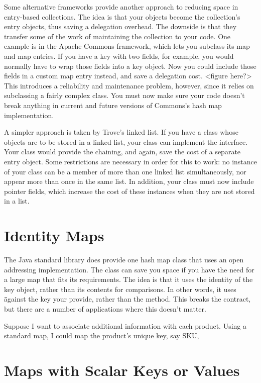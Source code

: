 Some alternative frameworks provide another approach to reducing space in
entry-based collections. The idea is that your objects become
the collection's entry objects, thus saving a delegation overhead. The downside
is that they transfer some of the work of maintaining the collection to your code.
One example is in the Apache Commons framework, which lets you subclass its map
and map entries. If you have a key with two fields, for example, you would
normally have to wrap those fields into a key object. Now 
you could include those fields in a custom map entry instead, and save a
delegation cost. <figure here?>  This introduces a reliability and maintenance
problem, however, since it relies on subclassing a fairly complex class. You must now make sure
your code doesn't break anything in current and future versions of Commons's
hash map implementation.

A simpler approach is taken by Trove's linked list. If you have a class whose
objects are to be stored in a linked list, your class can implement the
 interface. Your class would provide the chaining, and
again, save the cost of a separate entry object.  Some restrictions are
necessary in order for this to work: no instance of your class can
be a member of more than one linked list simultaneously, nor appear more than
once in the same list. In addition, your class must now include
pointer fields, which increase the cost of these instances when they are
not stored in a list.

\section{Identity Maps}
The Java standard library does provide one hash map class that uses an open
addressing implementation. The  class can save you space
if you have the need for a large map that fits its requirements.  The idea is that
it uses the identity of the key object, 
rather than its contents for comparisons. In
other words, it uses \=\= against the key your provide, rather than the  method.  
This breaks the  contract, but there are a number of applications where this doesn't matter.  

Suppose I want to associate additional information with each product.  Using a
standard map, I could map the product's unique key, say SKU, 



\section{Maps with Scalar Keys or Values}

